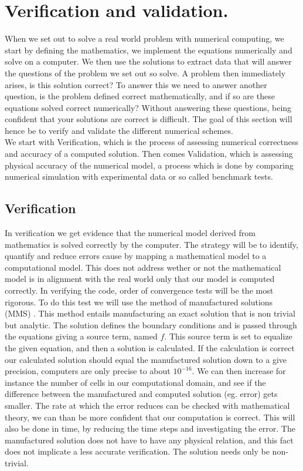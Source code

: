 \chapter{Verification and validation. }
When we set out to solve a real world problem with numerical computing, we start by defining the mathematics, we implement the equations numerically and solve on a computer. We then use the solutions to extract data that will answer the questions of the problem we set out so solve. A problem then immediately arises, is this solution correct? To answer this we need to answer another question, is the problem defined correct mathematically, and if so are these equations solved correct numerically? Without answering these questions, being confident that your solutions are correct is difficult. \cite{Selin2014} The goal of this section will hence be to verify and validate the different numerical schemes. \\
We start with Verification, which is the process of assessing numerical correctness and accuracy of a computed solution. Then comes Validation, which is assessing physical accuracy of the numerical model, a process which is done by comparing numerical simulation with experimental data or so called benchmark tests.


\section{Verification}
In verification we get evidence that the numerical model derived from mathematics is solved correctly by the computer. The strategy will be to identify, quantify and reduce errors cause by mapping a mathematical model to a computational model. This does not address wether or not the mathematical model is in alignment with the real world only that our model is computed correctly.
In verifying the code, order of convergence tests will be the most rigorous. To do this test we will use the method of manufactured solutions (MMS) \cite{Roache2002}. This method entails manufacturing an exact solution that is non trivial but analytic. The solution defines the boundary conditions and is passed through the equations giving a source term, named $f$. This source term is set to equalize the given equation, and then a solution is calculated. If the calculation is correct our calculated solution should equal the manufactured solution down to a give precision, computers are only precise to about $10^{-16}$. We can then increase for instance the number of cells in our computational domain, and see if the difference between the manufactured and computed solution (eg. error) gets smaller. The rate at which the error reduces can be checked with mathematical theory, we can than be more confident that our computation is correct. This will also be done in time, by reducing the time steps and investigating the error. The manufactured solution does not have to have any physical relation, and this fact does not implicate a less accurate verification. The solution needs only be non-trivial.


